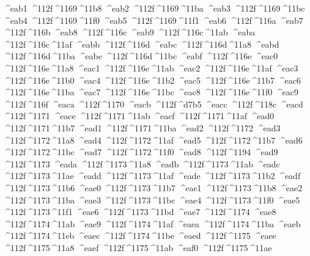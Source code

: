 \checkit ^^^^eab1 ^^^^112f^^^^1169^^^^11b8
\checkit ^^^^eab2 ^^^^112f^^^^1169^^^^11ba
\checkit ^^^^eab3 ^^^^112f^^^^1169^^^^11bc
\checkit ^^^^eab4 ^^^^112f^^^^1169^^^^11f0
\checkit ^^^^eab5 ^^^^112f^^^^1169^^^^11f1
\checkit ^^^^eab6 ^^^^112f^^^^116a
\checkit ^^^^eab7 ^^^^112f^^^^116b
\checkit ^^^^eab8 ^^^^112f^^^^116c
\checkit ^^^^eab9 ^^^^112f^^^^116c^^^^11ab
\checkit ^^^^eaba ^^^^112f^^^^116c^^^^11af
\checkit ^^^^eabb ^^^^112f^^^^116d
\checkit ^^^^eabc ^^^^112f^^^^116d^^^^11a8
\checkit ^^^^eabd ^^^^112f^^^^116d^^^^11ba
\checkit ^^^^eabe ^^^^112f^^^^116d^^^^11bc
\checkit ^^^^eabf ^^^^112f^^^^116e
\checkit ^^^^eac0 ^^^^112f^^^^116e^^^^11a8
\checkit ^^^^eac1 ^^^^112f^^^^116e^^^^11ab
\checkit ^^^^eac2 ^^^^112f^^^^116e^^^^11af
\checkit ^^^^eac3 ^^^^112f^^^^116e^^^^11b0
\checkit ^^^^eac4 ^^^^112f^^^^116e^^^^11b2
\checkit ^^^^eac5 ^^^^112f^^^^116e^^^^11b7
\checkit ^^^^eac6 ^^^^112f^^^^116e^^^^11ba
\checkit ^^^^eac7 ^^^^112f^^^^116e^^^^11bc
\checkit ^^^^eac8 ^^^^112f^^^^116e^^^^11f0
\checkit ^^^^eac9 ^^^^112f^^^^116f
\checkit ^^^^eaca ^^^^112f^^^^1170
\checkit ^^^^eacb ^^^^112f^^^^d7b5
\checkit ^^^^eacc ^^^^112f^^^^118c
\checkit ^^^^eacd ^^^^112f^^^^1171
\checkit ^^^^eace ^^^^112f^^^^1171^^^^11ab
\checkit ^^^^eacf ^^^^112f^^^^1171^^^^11af
\checkit ^^^^ead0 ^^^^112f^^^^1171^^^^11b7
\checkit ^^^^ead1 ^^^^112f^^^^1171^^^^11ba
\checkit ^^^^ead2 ^^^^112f^^^^1172
\checkit ^^^^ead3 ^^^^112f^^^^1172^^^^11a8
\checkit ^^^^ead4 ^^^^112f^^^^1172^^^^11af
\checkit ^^^^ead5 ^^^^112f^^^^1172^^^^11b7
\checkit ^^^^ead6 ^^^^112f^^^^1172^^^^11bc
\checkit ^^^^ead7 ^^^^112f^^^^1172^^^^11f0
\checkit ^^^^ead8 ^^^^112f^^^^1194
\checkit ^^^^ead9 ^^^^112f^^^^1173
\checkit ^^^^eada ^^^^112f^^^^1173^^^^11a8
\checkit ^^^^eadb ^^^^112f^^^^1173^^^^11ab
\checkit ^^^^eadc ^^^^112f^^^^1173^^^^11ae
\checkit ^^^^eadd ^^^^112f^^^^1173^^^^11af
\checkit ^^^^eade ^^^^112f^^^^1173^^^^11b2
\checkit ^^^^eadf ^^^^112f^^^^1173^^^^11b6
\checkit ^^^^eae0 ^^^^112f^^^^1173^^^^11b7
\checkit ^^^^eae1 ^^^^112f^^^^1173^^^^11b8
\checkit ^^^^eae2 ^^^^112f^^^^1173^^^^11ba
\checkit ^^^^eae3 ^^^^112f^^^^1173^^^^11bc
\checkit ^^^^eae4 ^^^^112f^^^^1173^^^^11f0
\checkit ^^^^eae5 ^^^^112f^^^^1173^^^^11f1
\checkit ^^^^eae6 ^^^^112f^^^^1173^^^^11bd
\checkit ^^^^eae7 ^^^^112f^^^^1174
\checkit ^^^^eae8 ^^^^112f^^^^1174^^^^11ab
\checkit ^^^^eae9 ^^^^112f^^^^1174^^^^11af
\checkit ^^^^eaea ^^^^112f^^^^1174^^^^11ba
\checkit ^^^^eaeb ^^^^112f^^^^1174^^^^11eb
\checkit ^^^^eaec ^^^^112f^^^^1174^^^^11be
\checkit ^^^^eaed ^^^^112f^^^^1175
\checkit ^^^^eaee ^^^^112f^^^^1175^^^^11a8
\checkit ^^^^eaef ^^^^112f^^^^1175^^^^11ab
\checkit ^^^^eaf0 ^^^^112f^^^^1175^^^^11ae
